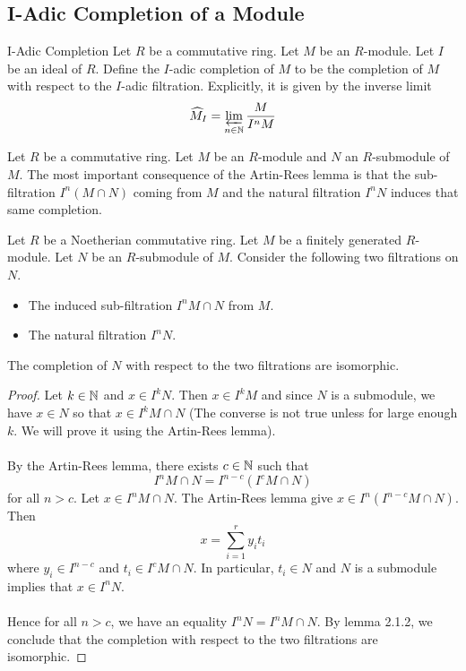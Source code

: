 \documentclass[a4paper]{article}
\begin{document}
\subsection{I-Adic Completion of a Module}
\begin{defn}{I-Adic Completion}{} Let $R$ be a commutative ring. Let $M$ be an $R$-module. Let $I$ be an ideal of $R$. Define the $I$-adic completion of $M$ to be the completion of $M$ with respect to the $I$-adic filtration. Explicitly, it is given by the inverse limit $$\widehat{M}_I=\varprojlim_{n\in\mathbb{N}}\frac{M}{I^nM}$$
\end{defn}

Let $R$ be a commutative ring. Let $M$ be an $R$-module and $N$ an $R$-submodule of $M$. The most important consequence of the Artin-Rees lemma is that the sub-filtration $I^n(M\cap N)$ coming from $M$ and the natural filtration $I^nN$ induces that same completion. 

\begin{prp}{}{}Let $R$ be a Noetherian commutative ring. Let $M$ be a finitely generated $R$-module. Let $N$ be an $R$-submodule of $M$. Consider the following two filtrations on $N$. 
\begin{itemize}
\item The induced sub-filtration $I^nM\cap N$ from $M$. 
\item The natural filtration $I^nN$. 
\end{itemize}
The completion of $N$ with respect to the two filtrations are isomorphic. 
\begin{proof}
Let $k\in\mathbb{N}$ and $x\in I^kN$. Then $x\in I^kM$ and since $N$ is a submodule, we have $x\in N$ so that $x\in I^kM\cap N$ (The converse is not true unless for large enough $k$. We will prove it using the Artin-Rees lemma). \\~\\

By the Artin-Rees lemma, there exists $c\in\mathbb{N}$ such that $$I^nM\cap N=I^{n-c}(I^cM\cap N)$$ for all $n>c$. Let $x\in I^nM\cap N$. The Artin-Rees lemma give $x\in I^n(I^{n-c}M\cap N)$. Then $$x=\sum_{i=1}^ry_it_i$$ where $y_i\in I^{n-c}$ and $t_i\in I^cM\cap N$. In particular, $t_i\in N$ and $N$ is a submodule implies that $x\in I^nN$. \\~\\

Hence for all $n>c$, we have an equality $I^nN=I^nM\cap N$. By lemma 2.1.2, we conclude that the completion with respect to the two filtrations are isomorphic. 
\end{proof}
\end{prp}
\end{document}
